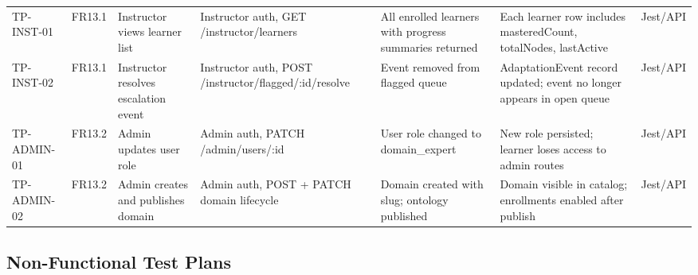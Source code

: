 \begin{longtable}{p{1.8cm}p{1.5cm}p{2.2cm}p{2.2cm}p{2.5cm}p{1.8cm}p{1.2cm}}
TP-INST-01 & FR13.1 & Instructor views learner list & Instructor auth, GET /instructor/learners & All enrolled learners with progress summaries returned & Each learner row includes masteredCount, totalNodes, lastActive & Jest/API \\
TP-INST-02 & FR13.1 & Instructor resolves escalation event & Instructor auth, POST /instructor/flagged/:id/resolve & Event removed from flagged queue & AdaptationEvent record updated; event no longer appears in open queue & Jest/API \\
TP-ADMIN-01 & FR13.2 & Admin updates user role & Admin auth, PATCH /admin/users/:id & User role changed to domain\_expert & New role persisted; learner loses access to admin routes & Jest/API \\
TP-ADMIN-02 & FR13.2 & Admin creates and publishes domain & Admin auth, POST + PATCH domain lifecycle & Domain created with slug; ontology published & Domain visible in catalog; enrollments enabled after publish & Jest/API \\
\bottomrule
\end{longtable}

\subsection{Non-Functional Test Plans}
\label{sec:nonfunc-test-plans}

